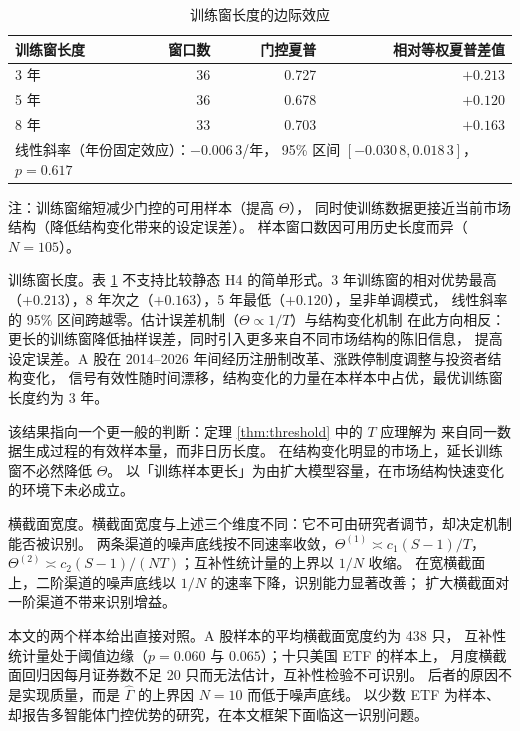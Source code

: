 \begin{table}[htbp]
\centering
\caption{训练窗长度的边际效应}
\label{tab:trainlen}
\begin{threeparttable}
\small
\begin{tabular}{lrrr}
\toprule
训练窗长度 & 窗口数 & 门控夏普 & 相对等权夏普差值 \\
\midrule
3 年 & 36 & 0.727 & $+0.213$ \\
5 年 & 36 & 0.678 & $+0.120$ \\
8 年 & 33 & 0.703 & $+0.163$ \\
\midrule
\multicolumn{4}{l}{线性斜率（年份固定效应）：$-0.006\,3$/年，
95\% 区间 $[-0.030\,8,0.018\,3]$，$p=0.617$} \\
\bottomrule
\end{tabular}
\begin{tablenotes}[flushleft]\footnotesize
\item 注：训练窗缩短减少门控的可用样本（提高 $\Theta$），
同时使训练数据更接近当前市场结构（降低结构变化带来的设定误差）。
样本窗口数因可用历史长度而异（$N=105$）。
\end{tablenotes}
\end{threeparttable}
\end{table}

训练窗长度。表 \ref{tab:trainlen} 不支持比较静态 H4 的简单形式。3 年训练窗的相对优势最高
（$+0.213$），8 年次之（$+0.163$），5 年最低（$+0.120$），呈非单调模式，
线性斜率的 95\% 区间跨越零。估计误差机制（$\Theta\propto1/T$）与结构变化机制
在此方向相反：更长的训练窗降低抽样误差，同时引入更多来自不同市场结构的陈旧信息，
提高设定误差。A 股在 2014--2026 年间经历注册制改革、涨跌停制度调整与投资者结构变化，
信号有效性随时间漂移，结构变化的力量在本样本中占优，最优训练窗长度约为 3 年。

该结果指向一个更一般的判断：定理 \ref{thm:threshold} 中的 $T$ 应理解为
来自同一数据生成过程的有效样本量，而非日历长度。
在结构变化明显的市场上，延长训练窗不必然降低 $\Theta$。
以「训练样本更长」为由扩大模型容量，在市场结构快速变化的环境下未必成立。

横截面宽度。横截面宽度与上述三个维度不同：它不可由研究者调节，却决定机制能否被识别。
两条渠道的噪声底线按不同速率收敛，$\Theta^{(1)}\asymp c_1(S-1)/T$，
$\Theta^{(2)}\asymp c_2(S-1)/(NT)$；互补性统计量的上界以 $1/N$ 收缩。
在宽横截面上，二阶渠道的噪声底线以 $1/N$ 的速率下降，识别能力显著改善；
扩大横截面对一阶渠道不带来识别增益。

本文的两个样本给出直接对照。A 股样本的平均横截面宽度约为 438 只，
互补性统计量处于阈值边缘（$p=0.060$ 与 $0.065$）；十只美国 ETF 的样本上，
月度横截面回归因每月证券数不足 20 只而无法估计，互补性检验不可识别。
后者的原因不是实现质量，而是 $\hat\Gamma$ 的上界因 $N=10$ 而低于噪声底线。
以少数 ETF 为样本、却报告多智能体门控优势的研究，在本文框架下面临这一识别问题。

